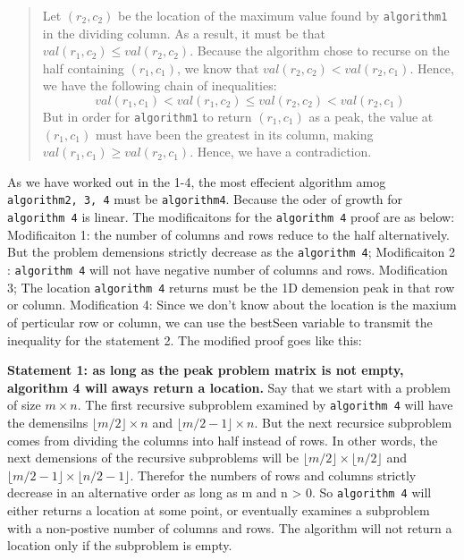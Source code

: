 \documentclass[12pt,twoside]{article}
\begin{document}
\begin{problems}
\begin{quote}
Let $(r_2, c_2)$ be
the location of the maximum value found by \texttt{algorithm1}
in the dividing column.
As a result, it must be that $val(r_1, c_2) \le val(r_2, c_2)$.
Because the algorithm chose to recurse
on the half containing $(r_1, c_1)$,
we know that $val(r_2, c_2) < val(r_2, c_1)$.
Hence, we have the following chain of inequalities:
$$val(r_1, c_1) < val(r_1, c_2) \le val(r_2, c_2) < val(r_2, c_1)$$
But in order for \texttt{algorithm1} to return $(r_1, c_1)$ as a peak,
the value at $(r_1, c_1)$ must have been the greatest in its column,
making $val(r_1, c_1) \ge val(r_2, c_1)$.
Hence, we have a contradiction.
\end{quote}

\ifsolution \solution{}
\par As we  have worked out in the 1-4, the most effecient algorithm amog  \texttt{algorithm2, 3, 4} must be  \texttt{algorithm4}. Because the oder of growth for \texttt{algorithm 4} is linear.  The modificaitons for the \texttt{algorithm 4} proof are as below:
Modificaiton 1: the number of columns and rows reduce to the half alternatively. But the problem demensions strictly decrease as the  \texttt{algorithm 4};
Modificaiton 2 :  \texttt{algorithm 4} will not have negative number of columns and rows.
Modification 3; The location  \texttt{algorithm 4} returns must be the 1D demension peak in that row or column. 
Modification 4: Since we don't know about the location is the maxium of perticular row or column, we can use  the bestSeen variable to transmit the inequality for the statement 2.
The modified proof goes like this:  \par
\textbf{Statement 1: as long as the peak problem matrix is not empty, algorithm 4 will aways return a location.}  Say that we start with a problem of size $m \times n$.  The first recursive subproblem examined by \texttt{algorithm 4} will have the demensilns $ \lfloor m / 2 \rfloor \times n$ and $\lfloor m/2 -1 \rfloor \times n$. But the next recursice subproblem comes from dividing the columns into half instead of rows. In other words, the next demensions of the recursive subproblems will be $ \lfloor m /2 \rfloor \times \lfloor n/2 \rfloor$ and $\lfloor m/2 -1 \rfloor \times \lfloor n/2 -1 \rfloor$. Therefor the numbers of rows and columns strictly decrease  in an alternative order as long as m and n > 0. So \texttt{algorithm 4} will either returns a location at some  point, or eventually examines a subproblem with a non-postive number of columns and rows. The algorithm will not return a location only if the subproblem is empty. \par

\end{problems}
\end{document}
